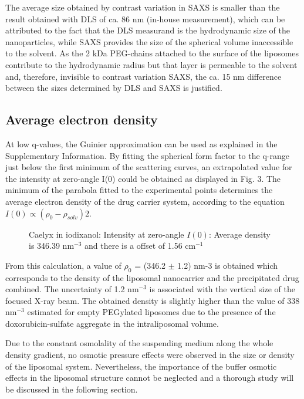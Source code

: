 The average size obtained by contrast variation in SAXS is smaller than the result obtained with DLS of ca. 86 nm (in-house measurement), which can be attributed to the fact that the DLS measurand is the hydrodynamic size of the nanoparticles, while SAXS provides the size of the spherical volume inaccessible to the solvent. As the 2 kDa PEG-chains attached to the surface of the liposomes contribute to the hydrodynamic radius but that layer is permeable to the solvent and, therefore, invisible to contrast variation SAXS, the ca. 15 nm difference between the sizes determined by DLS and SAXS is justified. 

\subsection{Average electron density}
At low q-values, the Guinier approximation can be used as explained in the Supplementary Information. By fitting the spherical form factor to the q-range just below the first minimum of the scattering curves, an extrapolated value for the intensity at zero-angle I(0) could be obtained as displayed in Fig. 3. The minimum of the parabola fitted to the experimental points determines the average electron density of the drug carrier system, according to the equation $I(0) \propto (\rho_0-\rho_{solv})2$.

\begin{figure}
	\centering
		
		\caption{Caelyx in iodixanol: Intensity at zero-angle $I(0)$: Average density is 346.39 nm$^{-3}$ and there is a offset of 1.56 cm$^{-1}$}
		\label{fig:CaelyxAverageDensity}
\end{figure}

From this calculation, a value of $\rho_0$ = (346.2 $\pm$ 1.2) nm-3 is obtained which corresponds to the density of the liposomal nanocarrier and the precipitated drug combined. The uncertainty of 1.2 nm$^{-3}$ is associated with the vertical size of the focused X-ray beam. The obtained density is slightly higher than the value of 338 nm$^{-3}$ estimated for empty PEGylated liposomes due to the presence of the doxorubicin-sulfate aggregate in the intraliposomal volume. 

Due to the constant osmolality of the suspending medium along the whole density gradient, no osmotic pressure effects were observed in the size or density of the liposomal system. Nevertheless, the importance of the buffer osmotic effects in the liposomal structure cannot be neglected and a thorough study will be discussed in the following section.

